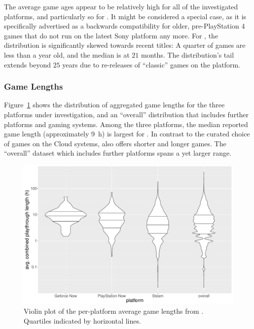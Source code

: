 The average
game ages appear to be relatively high for all of the investigated
platforms, and particularly so for \psnow. It might be considered a
special case, as it is specifically advertised as a backwards
compatibility for older, pre-PlayStation 4 games that do not run on the
latest Sony platform any more. For \steam, the distribution is
significantly skewed towards recent titles: A quarter of games are less
than a year old, and the median is at $21$ months. The
distribution's tail extends beyond $25$ years due to re-releases
of ``classic'' games on the platform.


\subsubsection{Game Lengths}
Figure~\ref{fig:gamelengths-violin} shows the distribution of aggregated
game lengths for the three platforms under investigation, and an
``overall'' distribution that includes further platforms and gaming
systems. Among the three platforms, the median reported game
length (approximately \SI{9}{\hour}) is largest for \gfnow. In
contrast to the curated choice of games on the Cloud systems, \steam
also offers shorter and longer games.
The ``overall'' dataset which includes further platforms spans a
yet larger range.


\begin{figure}[!t]
	\centering
	\includegraphics[width=1.0\columnwidth]{images/gamelengths-by-platform-violin.pdf}
	\caption{Violin plot of the per-platform average game lengths from \hltb. Quartiles indicated by horizontal lines.}
\label{fig:gamelengths-violin}
\end{figure}



